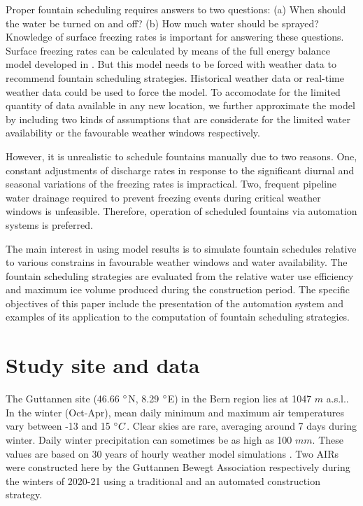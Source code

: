 \documentclass[tc, manuscript]{copernicus}
\begin{document}
Proper fountain scheduling requires answers to two questions: (a) When should the water be turned on and off?
(b) How much water should be sprayed? Knowledge of surface freezing rates is important for answering these
questions. Surface freezing rates can be calculated by means of the full energy balance model developed in
\cite{balasubramanianInfluenceMeteorologicalConditions2022}. But this model needs to be forced with weather data
to recommend fountain scheduling strategies. Historical weather data or real-time weather data could be used to
force the model. To accomodate for the limited quantity of data available in any new location, we further
approximate the model by including two kinds of assumptions that are considerate for the limited water
availability or the favourable weather windows respectively.

However, it is unrealistic to schedule fountains manually due to two reasons. One, constant adjustments of
discharge rates in response to the significant diurnal and seasonal variations of the freezing rates is
impractical. Two, frequent pipeline water drainage required to prevent freezing events during critical weather
windows is unfeasible. Therefore, operation of scheduled fountains via automation systems is preferred.

The main interest in using model results is to simulate fountain schedules relative to various constrains in
favourable weather windows and water availability. The fountain scheduling strategies are evaluated from the
relative water use efficiency and maximum ice volume produced during the construction period. The specific
objectives of this paper include the presentation of the automation system and examples of its application to
the computation of fountain scheduling strategies.

\section{Study site and data}

The Guttannen site (46.66 $^{\circ}$N, 8.29 $^{\circ}$E) in the Bern region lies at 1047 $m$ a.s.l.. In the winter
(Oct-Apr), mean daily minimum and maximum air temperatures vary between -13 and 15 $^{\circ} C$. Clear skies are
rare, averaging around 7 days during winter. Daily winter precipitation can sometimes be as high as 100 $mm$.
These values are based on 30 years of hourly weather model simulations \citep{guttannen}. Two AIRs were
constructed here by the Guttannen Bewegt Association respectively during the winters of 2020-21 using a
traditional and an automated construction strategy.
\end{document}
